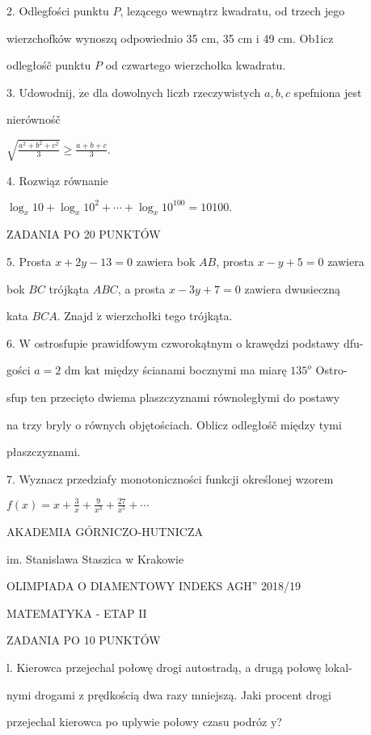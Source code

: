 \documentclass[a4paper,12pt]{article}
\begin{document}
2. Odlegfości punktu $P$, lezącego wewnątrz kwadratu, od trzech jego

wierzchofków wynoszq odpowiednio 35 cm, 35 cm i 49 cm. Ob1icz

odległośč punktu $P$ od czwartego wierzchołka kwadratu.

3. Udowodnij, $\dot{\mathrm{z}}\mathrm{e}$ dla dowolnych liczb rzeczywistych $a, b, c$ spefniona jest

nierównośč

$\displaystyle \sqrt{\frac{a^{2}+b^{2}+c^{2}}{3}}\geq\frac{a+b+c}{3}.$

4. Rozwiąz równanie

$\log_{x}10+\log_{x}10^{2}+\cdots+\log_{x}10^{100}=10100.$

ZADANIA PO 20 PUNKTÓW

5. Prosta $x+2y-13=0$ zawiera bok $AB$, prosta $x-y+5=0$ zawiera

bok $BC$ trójkąta $ABC$, a prosta $x-3y+7=0$ zawiera dwusieczną

kata $BCA.$ Znajd $\acute{\mathrm{z}}$ wierzchołki tego trójkąta.

6. $\mathrm{W}$ ostrosfupie prawidfowym czworokątnym o krawędzi podstawy dfu-

gości $a=2$ dm $\mathrm{k}\mathrm{a}\mathrm{t}$ między ścianami bocznymi ma miarę $135^{o}$ Ostro-

sfup ten przecięto dwiema plaszczyznami równoległymi do postawy

na trzy bryly o równych objętościach. Oblicz odległośč między tymi

płaszczyznami.

7. Wyznacz przedziafy monotoniczności funkcji określonej wzorem

$ f(x)=x+\displaystyle \frac{3}{x}+\frac{9}{x^{3}}+\frac{27}{x^{5}}+\cdots$






AKADEMIA GÓRNICZO-HUTNICZA

im. Stanislawa Staszica w Krakowie

OLIMPIADA O DIAMENTOWY INDEKS AGH'' 2018/19

MATEMATYKA - ETAP II

ZADANIA PO 10 PUNKTÓW

l. Kierowca przejechal połowę drogi autostradą, a drugą połowę lokal-

nymi drogami z prędkością dwa razy mniejszą. Jaki procent drogi

przejechal kierowca po uplywie połowy czasu podróz $\mathrm{y}$?
\end{document}
